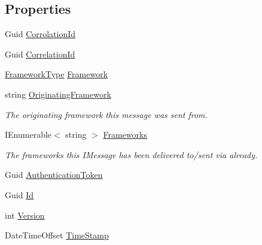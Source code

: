 \subsection*{Properties}
\begin{DoxyCompactItemize}
\item 
Guid \hyperlink{classCqrs_1_1Akka_1_1Tests_1_1Unit_1_1Events_1_1ConversationEnded_ad80a1eaaca1e0bdbe1192c364623f851}{Corrolation\+Id}
\item 
Guid \hyperlink{classCqrs_1_1Akka_1_1Tests_1_1Unit_1_1Events_1_1ConversationEnded_a99ad268bb52a4214a4b717bb8ecea6b6}{Correlation\+Id}
\item 
\hyperlink{namespaceCqrs_1_1Messages_af06a7e6cd2609043d0f2f5f3419f81e3}{Framework\+Type} \hyperlink{classCqrs_1_1Akka_1_1Tests_1_1Unit_1_1Events_1_1ConversationEnded_a9715459d0659db95b9471c50f5d280b8}{Framework}
\item 
string \hyperlink{classCqrs_1_1Akka_1_1Tests_1_1Unit_1_1Events_1_1ConversationEnded_a84f8392985be189ed8394d308c76692f}{Originating\+Framework}
\begin{DoxyCompactList}\small\item\em The originating framework this message was sent from. \end{DoxyCompactList}\item 
I\+Enumerable$<$ string $>$ \hyperlink{classCqrs_1_1Akka_1_1Tests_1_1Unit_1_1Events_1_1ConversationEnded_a1a8b4fd91323c4c9140051dff5f2bff6}{Frameworks}
\begin{DoxyCompactList}\small\item\em The frameworks this I\+Message has been delivered to/sent via already. \end{DoxyCompactList}\item 
Guid \hyperlink{classCqrs_1_1Akka_1_1Tests_1_1Unit_1_1Events_1_1ConversationEnded_a025b7df73452f8e22337eabc4d11fab9}{Authentication\+Token}
\item 
Guid \hyperlink{classCqrs_1_1Akka_1_1Tests_1_1Unit_1_1Events_1_1ConversationEnded_ae8a319553a4df63661afcef6bcadd963}{Id}
\item 
int \hyperlink{classCqrs_1_1Akka_1_1Tests_1_1Unit_1_1Events_1_1ConversationEnded_a08eef17f722c411bea6ad6adb871ddfb}{Version}
\item 
Date\+Time\+Offset \hyperlink{classCqrs_1_1Akka_1_1Tests_1_1Unit_1_1Events_1_1ConversationEnded_a26f068ae3ca8f1e84277f133f8fc4620}{Time\+Stamp}
\end{DoxyCompactItemize}


